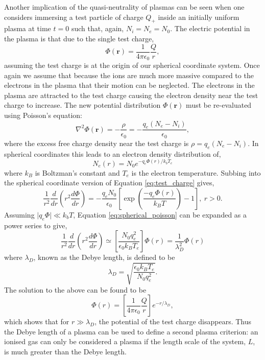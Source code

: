 Another implication of the quasi-neutrality of plasmas can be seen when one considers immersing a test particle of charge $Q_+$ inside an initially uniform plasma at time $t = 0$ such that, again, $N_i = N_e = N_0$. The electric potential in the plasma is that due to the single test charge, 
$$
\Phi (\mathbf{r}) = \frac{1}{4 \pi \epsilon_0} \frac{Q}{r},
$$
assuming the test charge is at the origin of our spherical coordinate system. Once again we assume that because the ions are much more massive compared to the electrons in the plasma that their motion can be neglected. The electrons in the plasma are attracted to the test charge causing the electron density near the test charge to increase. The new potential distribution $\Phi (\mathbf{r})$ must be re-evaluated using Poisson's equation:
\begin{equation}
\label{eq:test_charge}
\nabla^2 \Phi (\mathbf{r}) = - \frac{\rho}{\epsilon_0} = - \frac{q_e(N_e - N_i)}{\epsilon_0},
\end{equation}
where the excess free charge density near the test charge is $\rho = q_e (N_e - N_i)$. In spherical coordinates this leads to an electron density distribution of,
\begin{equation}
\label{eq:e_density}
N_e(r) = N_0 e^{-q_e \Phi (r)/k_b T_e}
\end{equation}
where $k_B$ is Boltzman's constant and $T_e$ is the electron temperature. Subbing into the spherical coordinate version of Equation \ref{eq:test_charge} gives,
\begin{equation}
\label{eq:spherical_poisson}
\frac{1}{r^2} \frac{d}{dr}\left(r^2 \frac{d \Phi}{dr} \right) = - \frac{q_e N_0}{\epsilon_0}\left[\exp\left(\frac{-q_e \Phi (r)}{k_BT}\right) -1 \right],\  r>0.
\end{equation}
Assuming $\vert q_e \Phi \vert \ll k_b T$, Equation \ref{eq:spherical_poisson} can be expanded as a power series to give, 
$$
\frac{1}{r^2} \frac{d}{dr}\left(r^2 \frac{d \Phi}{dr} \right) \simeq \left[ \frac{N_0q_e^2}{\epsilon_0 k_B T_e} \right]\Phi (r) = \frac{1}{\lambda_D^2}\Phi(r)
$$
where $\lambda_D$, known as the Debye length, is defined to be
\begin{equation}
\label{eq:debye_length}
\lambda_D = \sqrt{\frac{\epsilon_0 k_B T_e}{N_0 q_e^2}}.
\end{equation}
The solution to the above can be found to be 
\begin{equation}
\label{eq:phi_solution}
\Phi (r) = \left[ \frac{1}{4 \pi \epsilon_0} \frac{Q}{r}\right] e^{-r/\lambda_D},
\end{equation} 
which shows that for $r \gg \lambda_D$, the potential of the test charge disappears. Thus the Debye length of a plasma can be used to define a second plasma criterion: an ionised gas can only be considered a plasma if the length scale of the system, $L$, is much greater than the Debye length.
